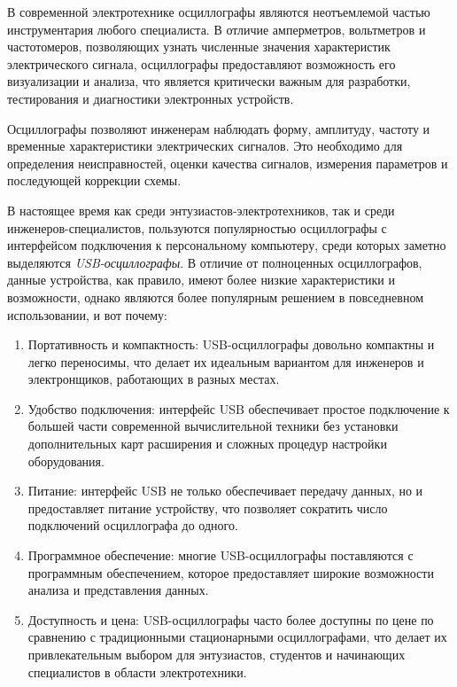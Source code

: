 
В современной электротехнике осциллографы являются неотъемлемой частью инструментария любого специалиста. В отличие амперметров, вольтметров и частотомеров, позволяющих узнать численные значения характеристик электрического сигнала, осциллографы предоставляют возможность его визуализации и анализа, что является критически важным для разработки, тестирования и диагностики электронных устройств.

Осциллографы позволяют инженерам наблюдать форму, амплитуду, частоту и временные характеристики электрических сигналов. Это необходимо для определения неисправностей, оценки качества сигналов, измерения параметров и последующей коррекции схемы.

В настоящее время как среди энтузиастов-электротехников, так и среди инженеров-специалистов, пользуются популярностью осциллографы с интерфейсом подключения к персональному компьютеру, среди которых заметно выделяются \emph{USB-осциллографы}. 
В отличие от полноценных осциллографов, данные устройства, как правило, имеют более низкие характеристики и возможности, однако являются более популярным решением в повседневном использовании, и вот почему:
\begin{enumerate}
    \item Портативность и компактность: USB-осциллографы довольно компактны и легко переносимы, что делает их идеальным вариантом для инженеров и электронщиков, работающих в разных местах.
    \item Удобство подключения: интерфейс USB обеспечивает простое подключение к большей части современной вычислительной техники без установки дополнительных карт расширения и сложных процедур настройки оборудования.
    \item Питание: интерфейс USB не только обеспечивает передачу данных, но и предоставляет питание устройству, что позволяет сократить число подключений осциллографа до одного.
    \item Программное обеспечение: многие USB-осциллографы поставляются с программным обеспечением, которое предоставляет широкие возможности анализа и представления данных.
    \item Доступность и цена: USB-осциллографы часто более доступны по цене по сравнению с традиционными стационарными осциллографами, что делает их привлекательным выбором для энтузиастов, студентов и начинающих специалистов в области электротехники.
\end{enumerate}

